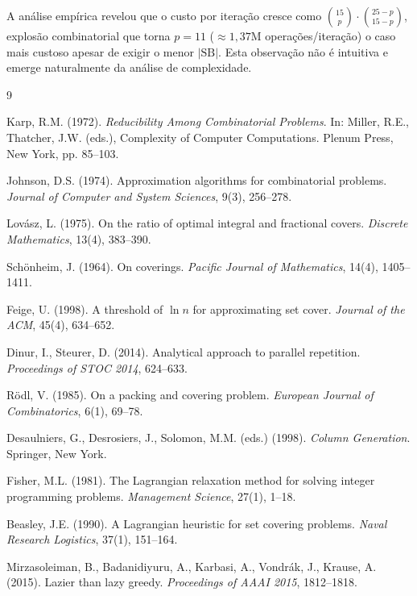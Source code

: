 \documentclass[12pt,a4paper]{article}
\theoremstyle{definition}
\newcommand{\C}[2]{\binom{#1}{#2}}
\newcommand{\SB}{\mathrm{SB}}
\begin{document}
A análise empírica revelou que o custo por iteração cresce como
$\C{15}{p} \cdot \C{25-p}{15-p}$, explosão combinatorial que torna $p=11$
($\approx 1{,}37$M operações/iteração) o caso mais custoso apesar de exigir o
menor $|\SB|$. Esta observação não é intuitiva e emerge naturalmente da
análise de complexidade.


\begin{thebibliography}{9}

Karp, R.M. (1972).
\textit{Reducibility Among Combinatorial Problems}.
In: Miller, R.E., Thatcher, J.W. (eds.), Complexity of Computer Computations.
Plenum Press, New York, pp. 85--103.

Johnson, D.S. (1974).
Approximation algorithms for combinatorial problems.
\textit{Journal of Computer and System Sciences}, 9(3), 256--278.

Lovász, L. (1975).
On the ratio of optimal integral and fractional covers.
\textit{Discrete Mathematics}, 13(4), 383--390.

Schönheim, J. (1964).
On coverings.
\textit{Pacific Journal of Mathematics}, 14(4), 1405--1411.

Feige, U. (1998).
A threshold of $\ln n$ for approximating set cover.
\textit{Journal of the ACM}, 45(4), 634--652.

Dinur, I., Steurer, D. (2014).
Analytical approach to parallel repetition.
\textit{Proceedings of STOC 2014}, 624--633.

Rödl, V. (1985).
On a packing and covering problem.
\textit{European Journal of Combinatorics}, 6(1), 69--78.

Desaulniers, G., Desrosiers, J., Solomon, M.M. (eds.) (1998).
\textit{Column Generation}.
Springer, New York.

Fisher, M.L. (1981).
The Lagrangian relaxation method for solving integer programming problems.
\textit{Management Science}, 27(1), 1--18.

Beasley, J.E. (1990).
A Lagrangian heuristic for set covering problems.
\textit{Naval Research Logistics}, 37(1), 151--164.

Mirzasoleiman, B., Badanidiyuru, A., Karbasi, A., Vondrák, J., Krause, A. (2015).
Lazier than lazy greedy.
\textit{Proceedings of AAAI 2015}, 1812--1818.


\end{thebibliography}
\end{document}
